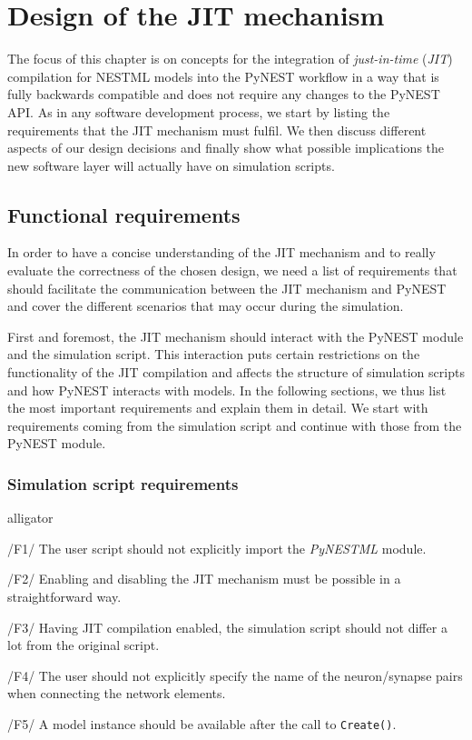 
\chapter{Design of the JIT mechanism}
\label{chap:jit}

The focus of this chapter is on concepts for the integration of \emph{just-in-time} (\emph{JIT}) compilation for NESTML models into the PyNEST workflow in a way that is fully backwards compatible and does not require any changes to the PyNEST API. As in any software development process, we start by listing the requirements that the JIT mechanism must fulfil. We then discuss different aspects of our design decisions and finally show what possible implications the new software layer will actually have on simulation scripts.

\section{Functional requirements}

In order to have a concise understanding of the JIT mechanism and to really evaluate the correctness of the chosen design, we need a list of requirements that should facilitate the communication between the JIT mechanism and PyNEST and cover the different scenarios that may occur during the simulation.

First and foremost, the JIT mechanism should interact with the PyNEST module and the simulation script. This interaction puts certain restrictions on the functionality of the JIT compilation and affects the structure of simulation scripts and how PyNEST interacts with models. In the following sections, we thus list the most important requirements and explain them in detail. We start with requirements coming from the simulation script and continue with those from the PyNEST module.

\subsection*{Simulation script requirements}

\begin{labeling}{alligator}
   \item[/F1/] The user script should not explicitly import the \emph{PyNESTML} module.
   \item[/F2/] Enabling and disabling the JIT mechanism must be possible in a straightforward way.
   \item[/F3/] Having JIT compilation enabled, the simulation script should not differ a lot from the original script.
   \item[/F4/]\label{req:F4} The user should not explicitly specify the name of the neuron/synapse pairs when connecting the network elements.
   \item[/F5/] A model instance should be available after the call to \texttt{Create()}.
\end{labeling}

